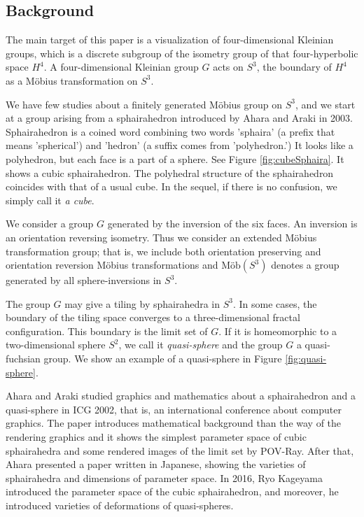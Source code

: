 \documentclass[suppldata, dvipdfmx]{interact}
\theoremstyle{plain}%
\theoremstyle{definition}
\theoremstyle{remark}
\theoremstyle{problemstyle}
\begin{document}
\subsection{Background}

The main target of this paper is a visualization of four-dimensional
Kleinian groups, which is a discrete subgroup of the isometry group of
that four-hyperbolic space $H^4$. A four-dimensional Kleinian group $G$ acts
on $S^3$, the boundary of $H^4$ as a M\"obius transformation on
$S^3$. \par
We have few studies about a finitely generated M\"obius group on $S^3$,
and we start at a group arising from a sphairahedron introduced by Ahara
and Araki in 2003\cite{AharaAraki}.
Sphairahedron is a coined word combining two words 'sphaira' (a prefix
that means 'spherical') and 'hedron' (a suffix comes from 'polyhedron.')
It looks like a polyhedron, but each face is a part of a sphere. See
Figure \ref{fig:cubeSphaira}. It shows a cubic sphairahedron. The
polyhedral structure of the sphairahedron coincides with that of a usual cube.  In the sequel, if there is no confusion, we simply call it {\it a cube}.

We consider a group $G$ generated by the inversion of the six faces. An
inversion is an orientation reversing isometry. Thus we consider an
extended M\"obius transformation group; that is, we include both
orientation preserving and orientation reversion M\"obius transformations
and $\text{M\"ob}(S^3)$ denotes a group generated by all
sphere-inversions in $S^3$.

The group $G$ may give a tiling by sphairahedra in $S^3$. In some cases, the
boundary of the tiling space converges to a three-dimensional fractal
configuration. This boundary is the limit set of $G$. If it is
homeomorphic to a two-dimensional sphere $S^2$, we call it
\textit{quasi-sphere} and the group $G$ a quasi-fuchsian group. We show
an example of a quasi-sphere in Figure \ref{fig:quasi-sphere}.

Ahara and Araki studied graphics and mathematics about a sphairahedron
and a quasi-sphere in ICG 2002, that is, an international conference about
computer graphics. 
The paper introduces mathematical background than the way of the rendering
graphics and it shows the simplest parameter space of cubic sphairahedra
and some rendered images of the limit set by POV-Ray.
After that, Ahara presented a paper written in Japanese\cite{AharaJa}, 
showing the varieties of sphairahedra and dimensions of parameter space.
In 2016, Ryo Kageyama\cite{kageyama} introduced the parameter space of the cubic sphairahedron, and moreover, he introduced varieties of deformations of
quasi-spheres.
\end{document}
